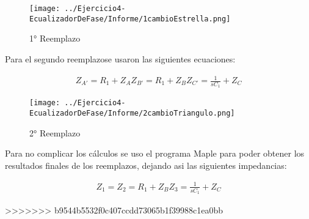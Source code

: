 \begin{figure}[h]
	\caption{1° Reemplazo}
	\centering
	\texttt{[image: ../Ejercicio4-EcualizadorDeFase/Informe/1cambioEstrella.png]}
	\label{1reemplazo} 
\end{figure}

Para el segundo reemplazose usaron las siguientes ecuaciones:

\begin{align}

	\begin{equation}
		Z_{A'}= R_1 + Z_{A}
	\end{equation}

	\begin{equation}
		Z_{B'}= R_1 + Z_{B}
	\end{equation}
	
	\begin{equation}
		Z_{C'}= \frac{1}{sC_1} + Z_{C}
	\end{equation}

\end{align}

\begin{figure}[h]
	\caption{2° Reemplazo}
	\centering
	\texttt{[image: ../Ejercicio4-EcualizadorDeFase/Informe/2cambioTriangulo.png]}
	\label{2reemplazo} 
\end{figure}


Para no complicar los cálculos se uso el programa Maple para poder obtener los resultados finales de los reemplazos, dejando asi las siguientes impedancias:

\begin{align}

	\begin{equation}
		Z_{1}= 
	\end{equation}

	\begin{equation}
		Z_{2}= R_1 + Z_{B}
	\end{equation}
	
	\begin{equation}
		Z_{3}= \frac{1}{sC_1} + Z_{C}
	\end{equation}

\end{align}




>>>>>>> b9544b5532f0c407ccdd73065b1f39988c1ea0bb
